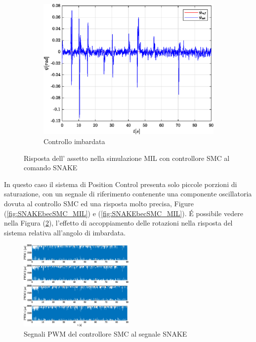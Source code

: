 \begin{figure}
	\hfill
	\begin{subfigure}{0.45\textwidth}
		\centering
		\includegraphics[width=1\textwidth]{Simulazioni/Figure/SMC/SNAKE_MIL/AttitudeControlYaw}
		\caption{Controllo imbardata}
		\label{fig:SNAKEyawSMC_MIL}
	\end{subfigure}
	\caption{Risposta dell' assetto nella simulazione MIL con controllore SMC al comando SNAKE}
\end{figure}

In questo caso il sistema di Position Control presenta solo piccole porzioni di saturazione, con un segnale di riferimento contenente una componente oscillatoria dovuta al controllo SMC ed una risposta molto precisa, Figure (\ref{fig:SNAKEbecSMC_MIL}) e (\ref{fig:SNAKEbecSMC_MIL}). \'E possibile vedere nella Figura (\ref{fig:SNAKEyawSMC_MIL}), l'effetto di accoppiamento delle rotazioni nella risposta del sistema relativa all'angolo di imbardata.

\begin{figure}
	\centering
	\includegraphics[width=0.5\textwidth]{Simulazioni/Figure/SMC/SNAKE_MIL/PWM}
	\caption{Segnali PWM del controllore SMC al segnale SNAKE}
	\label{fig:SNAKEPWMSMC_MIL}
\end{figure}


